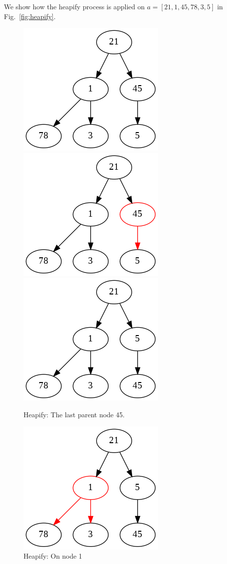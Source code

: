 \documentclass[../main.tex]{subfiles}
\begin{document}
We show how the heapify process is applied on $a=[21, 1, 45, 78, 3, 5]$ in Fig.~\ref{fig:heapify}.  
\begin{figure}[h!]
    \centering
    \includegraphics[width = 0.3\columnwidth]{fig/min_heap_heapify_1.png}
    \includegraphics[width = 0.3\columnwidth]{fig/min_heap_heapify_2.png}
    \includegraphics[width = 0.3\columnwidth]{fig/min_heap_heapify_3.png}
    \caption{Heapify: The last parent node 45.}
    \includegraphics[width = 0.3\columnwidth]{fig/min_heap_heapify_4.png}
    \caption{Heapify: On node 1}
    

\end{figure}
\end{document}
